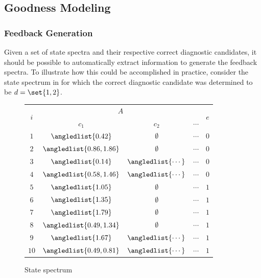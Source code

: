 \subsection{Goodness Modeling}
\subsubsection*{Feedback Generation}

Given a set of state spectra and their respective correct diagnostic
candidates, it should be possible to automatically extract information
to generate the feedback spectra.
%
To illustrate how this could be accomplished in practice, consider the
state spectrum in  for which the
correct diagnostic candidate was determined to be $d = \set{1,2}$.
%

\begin{figure}[!ht]
  \begin{tabular}[b]{c|ccc|c}
    \multirow{2}{*}{$i$} & \multicolumn{3}{c|}{$A$}                             & \multirow{2}{*}{$e$}                   \\
    \cline{2-4}
                         & $c_1$                                                & $c_2$                 & $\cdots$ &     \\ \hline
    $1$                  & \cellcolor{clra}   $\angledlist{0.42}$      & $\emptyset$           & $\cdots$ & $0$ \\
    $2$                  & \cellcolor{clra}   $\angledlist{0.86,1.86}$ & $\emptyset$           & $\cdots$ & $0$ \\
    $3$                  & \cellcolor{clra}   $\angledlist{0.14}$      & $\angledlist{\cdots}$ & $\cdots$ & $0$ \\
    $4$                  & \cellcolor{clra}   $\angledlist{0.58,1.46}$ & $\angledlist{\cdots}$ & $\cdots$ & $0$ \\
    $5$                  & \cellcolor{clrb} $\angledlist{1.05}$      & $\emptyset$           & $\cdots$ & $1$ \\
    $6$                  & \cellcolor{clrb} $\angledlist{1.35}$      & $\emptyset$           & $\cdots$ & $1$ \\
    $7$                  & \cellcolor{clrb} $\angledlist{1.79}$      & $\emptyset$           & $\cdots$ & $1$ \\
    $8$                  & \cellcolor{clrc}   $\angledlist{0.49,1.34}$ & $\emptyset$           & $\cdots$ & $1$ \\
    $9$                  & \cellcolor{clrc}   $\angledlist{1.67}$      & $\angledlist{\cdots}$ & $\cdots$ & $1$ \\
    $10$                 & \cellcolor{clrc}   $\angledlist{0.49,0.81}$ & $\angledlist{\cdots}$ & $\cdots$ & $1$ \\
  \end{tabular}
  \caption{State spectrum}
  \label{fig:conclusions:state-spectrum}
\end{figure}


